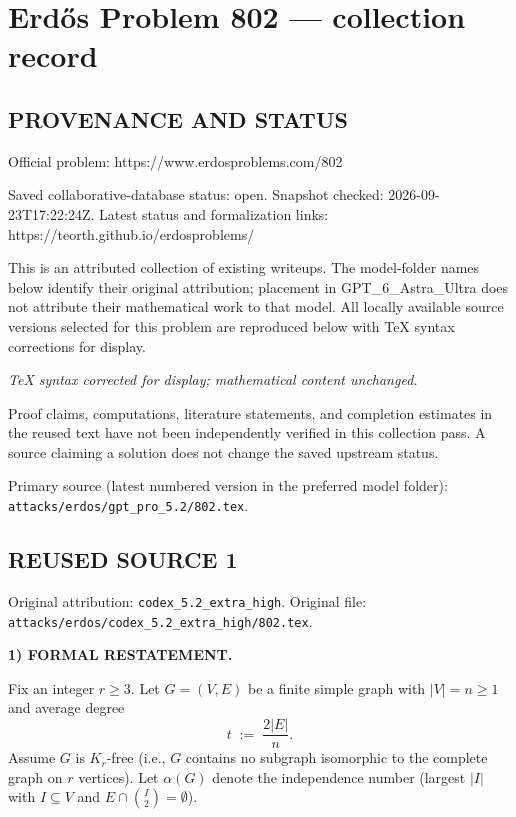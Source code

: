 \section*{Erd\H{o}s Problem 802 --- collection record}

\subsection*{PROVENANCE AND STATUS}
Official problem: https://www.erdosproblems.com/802

Saved collaborative-database status: open.
Snapshot checked: 2026-09-23T17:22:24Z.
Latest status and formalization links: https://teorth.github.io/erdosproblems/

This is an attributed collection of existing writeups. The model-folder names below identify their original attribution; placement in GPT\_6\_Astra\_Ultra does not attribute their mathematical work to that model. All locally available source versions selected for this problem are reproduced below with TeX syntax corrections for display.

\emph{TeX syntax corrected for display; mathematical content unchanged.}

Proof claims, computations, literature statements, and completion estimates in the reused text have not been independently verified in this collection pass. A source claiming a solution does not change the saved upstream status.

Primary source (latest numbered version in the preferred model folder): \texttt{attacks/erdos/gpt\_pro\_5.2/802.tex}.

\subsection*{REUSED SOURCE 1}
Original attribution: \texttt{codex\_5.2\_extra\_high}.
Original file: \texttt{attacks/erdos/codex\_5.2\_extra\_high/802.tex}.


\noindent\textbf{1) FORMAL RESTATEMENT.}

Fix an integer $r\ge 3$. Let $G=(V,E)$ be a finite simple graph with $|V|=n\ge 1$ and average degree
\[
 t\;:=\;\frac{2|E|}{n}.
\]
Assume $G$ is $K_r$-free (i.e., $G$ contains no subgraph isomorphic to the complete graph on $r$ vertices).
Let $\alpha(G)$ denote the independence number (largest $|I|$ with $I\subseteq V$ and $E\cap\binom{I}{2}=\emptyset$).

